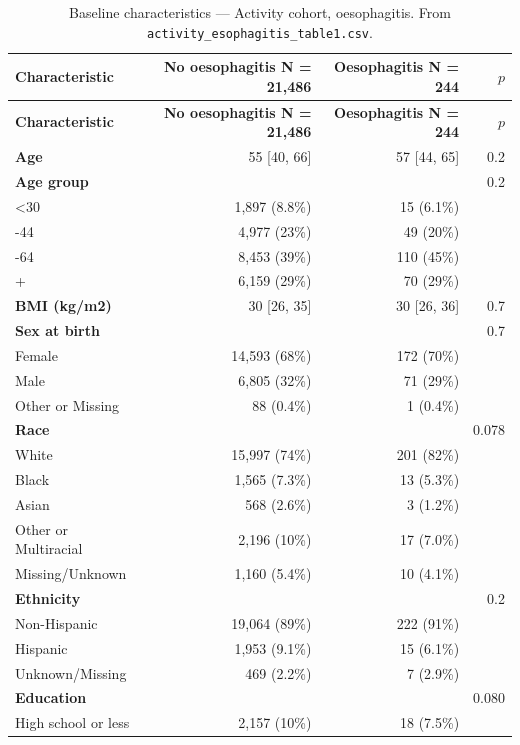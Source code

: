 \documentclass[11pt]{article}
\newcommand{\code}[1]{\texttt{\small #1}}
\begin{document}
\footnotesize\begin{longtable}{@{}p{6.4cm}rrr@{}}
\caption{Baseline characteristics --- Activity cohort, oesophagitis. From \code{activity\_esophagitis\_table1.csv}.}\label{tab:appM-t1-activity-esophagitis}\\
\toprule \textbf{Characteristic} & \textbf{No oesophagitis     N = 21,486} & \textbf{Oesophagitis     N = 244} & \textbf{$p$} \\ \midrule \endfirsthead
\toprule \textbf{Characteristic} & \textbf{No oesophagitis     N = 21,486} & \textbf{Oesophagitis     N = 244} & \textbf{$p$} \\ \midrule \endhead
\textbf{Age} & 55 [40, 66] & 57 [44, 65] & 0.2 \\
\textbf{Age group} &  &  & 0.2 \\
\quad <30 & 1,897 (8.8\%) & 15 (6.1\%) &  \\
\quad 30-44 & 4,977 (23\%) & 49 (20\%) &  \\
\quad 45-64 & 8,453 (39\%) & 110 (45\%) &  \\
\quad 65+ & 6,159 (29\%) & 70 (29\%) &  \\
\textbf{BMI (kg/m2)} & 30 [26, 35] & 30 [26, 36] & 0.7 \\
\textbf{Sex at birth} &  &  & 0.7 \\
\quad Female & 14,593 (68\%) & 172 (70\%) &  \\
\quad Male & 6,805 (32\%) & 71 (29\%) &  \\
\quad Other or Missing & 88 (0.4\%) & 1 (0.4\%) &  \\
\textbf{Race} &  &  & 0.078 \\
\quad White & 15,997 (74\%) & 201 (82\%) &  \\
\quad Black & 1,565 (7.3\%) & 13 (5.3\%) &  \\
\quad Asian & 568 (2.6\%) & 3 (1.2\%) &  \\
\quad Other or Multiracial & 2,196 (10\%) & 17 (7.0\%) &  \\
\quad Missing/Unknown & 1,160 (5.4\%) & 10 (4.1\%) &  \\
\textbf{Ethnicity} &  &  & 0.2 \\
\quad Non-Hispanic & 19,064 (89\%) & 222 (91\%) &  \\
\quad Hispanic & 1,953 (9.1\%) & 15 (6.1\%) &  \\
\quad Unknown/Missing & 469 (2.2\%) & 7 (2.9\%) &  \\
\textbf{Education} &  &  & 0.080 \\
\quad High school or less & 2,157 (10\%) & 18 (7.5\%) &  \\

\end{longtable}
\end{document}
